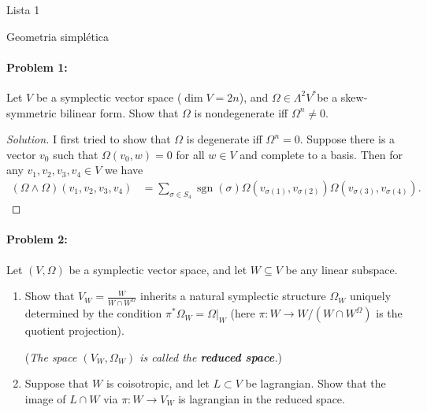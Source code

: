 




{\Huge Lista 1}

{\Large Geometria simpl\'etica}

\paragraph{Problem 1:} Let $V$ be a symplectic vector space ($\dim V=2n$), and $\Omega\in \Lambda^{2} V^{*}$be a skew-symmetric bilinear form. Show that $\Omega$ is nondegenerate iff $\Omega^{n} \neq 0$.

\begin{proof}[Solution]
	I first tried to show that $\Omega$ is degenerate iff $\Omega^{n}=0$. Suppose there is a vector $v_0$ such that $\Omega( v_0,w)=0$ for all $w\in V$ and complete to a basis. Then for any $v_1,v_2,v_3,v_4\in V$ we have
	 \begin{align*}
		 (\Omega\wedge \Omega)(v_1,v_2,v_3,v_4)&=\sum_{\sigma\in S_{4}}\operatorname{s gn}(\sigma)\Omega(v_{\sigma(1)},v_{\sigma(2)})\Omega(v_{\sigma(3)},v_{\sigma(4)}).
		 \end{align*}
\end{proof}

\paragraph{Problem 2:} Let $(V,\Omega)$ be a symplectic vector space, and let $W\subseteq V$ be any linear subspace.
\begin{enumerate}[label=\alph*.]
	\item Show that $V_{W}=\frac{W}{W\cap W^{\Omega}}$ inherits a natural symplectic structure $\Omega_{W}$ uniquely determined by the condition $\pi^{*} \Omega_{W}=\Omega|_{W}$ (here $\pi:W\to W/(W\cap W^{\Omega}) $ is the quotient projection).
	
		(\textit{The space $(V_{W},\Omega_{W})$ is called the \textbf{reduced space}.})

	\item Suppose that $W$ is coisotropic, and let $L\subset V$ be lagrangian. Show that the image of $L\cap W$ via $\pi:W\to V_{W}$ is lagrangian in the reduced space.
\end{enumerate}

